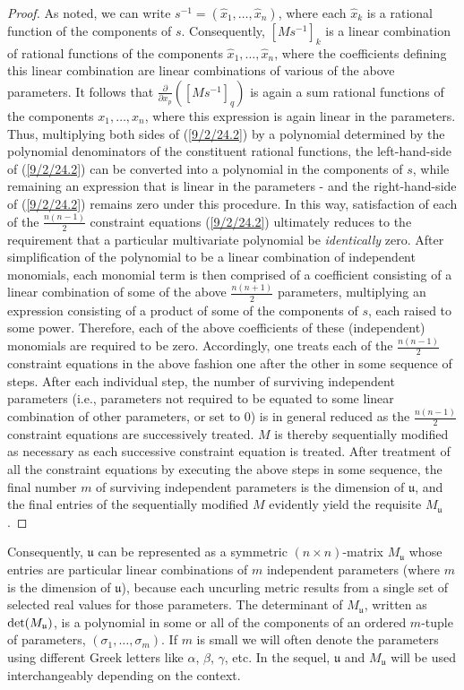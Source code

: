 \documentclass{amsart}
\theoremstyle{definition}
\numberwithin{theorem}{section}
\numberwithin{equation}{section}
\begin{document}
\begin{proof}
As noted, we can write $s^{-1} = (\hat{x}_1,\dots,\hat{x}_n)$, where each $\hat{x}_k$ is a rational function of the components of $s$.  Consequently, $[Ms^{-1}]_k$ is a linear combination of rational functions of the components $\hat{x}_1,\dots,\hat{x}_n$, where the coefficients defining this linear combination are linear combinations of various of the above parameters.  It follows that $\frac{\partial}{\partial x_p}([Ms^{-1}]_q)$ is again a sum rational functions of the components $x_1,\dots,x_n$, where this expression is again linear in the parameters.  Thus, multiplying both sides of (\ref{9/2/24.2}) by a polynomial determined by the polynomial denominators of the constituent rational functions, the left-hand-side of (\ref{9/2/24.2}) can be converted into a polynomial in the components of $s$, while remaining an expression that is linear in the parameters - and the right-hand-side of (\ref{9/2/24.2}) remains zero under this procedure.
In this way, satisfaction of each of the $\frac{n(n-1)}{2}$ constraint equations (\ref{9/2/24.2}) ultimately reduces to the requirement that a particular multivariate polynomial be {\it identically} zero.  After simplification of the polynomial to be a linear combination of independent monomials, each monomial term is then comprised of a coefficient consisting of a linear combination of some of the above $\frac{n(n+1)}{2}$ parameters, multiplying an expression consisting of a product of some of the components of $s$, each raised to some power.  Therefore, each of the above coefficients of these (independent) monomials are required to be zero.  Accordingly, one treats each of the $\frac{n(n-1)}{2}$ constraint equations in the above fashion one after the other in some sequence of steps.  After each individual step, the number of surviving independent parameters (i.e., parameters not required to be equated to some linear combination of other parameters, or set to 0) is in general reduced as the $\frac{n(n-1)}{2}$ constraint equations are successively treated.  $M$ is thereby sequentially modified as necessary as each successive constraint equation is treated.  After treatment of all the constraint equations by executing the above steps in some sequence, the final number $m$ of surviving independent parameters is the dimension of $\mathfrak{u}$, and the final entries of the sequentially modified $M$ evidently yield the requisite $M_\mathfrak{u}$.
\end{proof}

\enlargethispage{2cm}
Consequently, $\mathfrak{u}$ can be represented as a symmetric $(n\times n)$-matrix $M_{\mathfrak{u}}$ whose entries are particular linear combinations of $m$ independent parameters (where $m$ is the dimension of $\mathfrak{u}$), because each uncurling metric results from a single set of selected real values for those parameters.  The determinant of $M_{\mathfrak{u}}$, written as ${\rm det}(M_{\mathfrak{u}})$, is a polynomial in some or all of the components of an ordered $m$-tuple of parameters, $(\sigma_1,\dots,\sigma_m)$.  If $m$ is small  we will often denote the parameters using different Greek letters like $\alpha$, $\beta $, $\gamma$, etc. In the sequel, $\mathfrak{u}$ and $M_{\mathfrak{u}}$ will be used interchangeably depending on the context.
\end{document}
